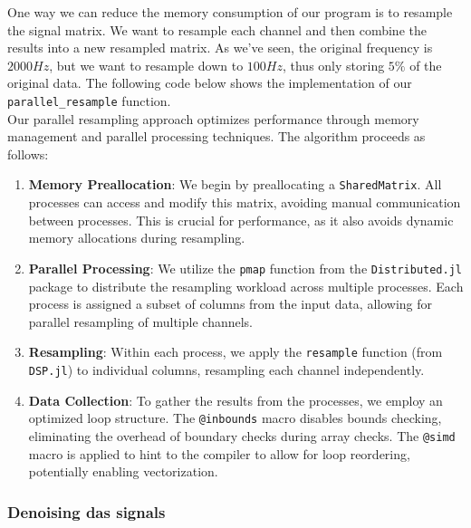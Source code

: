 One way we can reduce the memory consumption of our program is to resample the signal matrix. We want to resample each channel and then combine the results into a new resampled matrix. As we've seen, the original frequency is $2000Hz$, but we want to resample down to $100Hz$, thus only storing $5\%$ of the original data. The following code below shows the implementation of our \texttt{parallel\_resample} function. \\



Our parallel resampling approach optimizes performance through memory management and parallel processing techniques. The algorithm proceeds as follows:

\begin{enumerate}
    \item \textbf{Memory Preallocation}: We begin by preallocating a \texttt{SharedMatrix}. All processes can access and modify this matrix, avoiding manual communication between processes. This is crucial for performance, as it also avoids dynamic memory allocations during resampling.
    \item \textbf{Parallel Processing}: We utilize the \texttt{pmap} function from the \texttt{Distributed.jl} package to distribute the resampling workload across multiple processes. Each process is assigned a subset of columns from the input data, allowing for parallel resampling of multiple channels.
    \item \textbf{Resampling}: Within each process, we apply the \texttt{resample} function (from \texttt{DSP.jl}) to individual columns, resampling each channel independently.
    \item \textbf{Data Collection}: To gather the results from the processes, we employ an optimized loop structure. The \texttt{@inbounds} macro disables bounds checking, eliminating the overhead of boundary checks during array checks. The \texttt{@simd} macro is applied to hint to the compiler to allow for loop reordering, potentially enabling vectorization.
\end{enumerate}



\subsubsection{Denoising \acrshort{das} signals}

